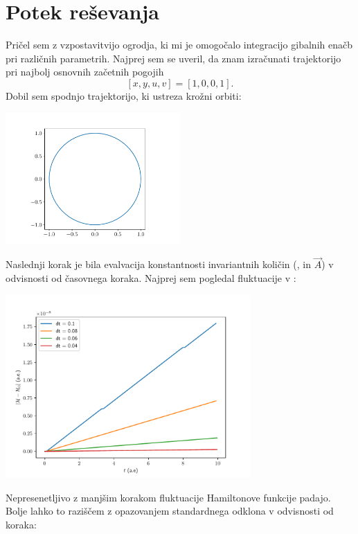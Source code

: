 \section{Potek reševanja}
Pričel sem z vzpostavitvijo ogrodja, ki mi je omogočalo integracijo gibalnih enačb pri različnih parametrih. Najprej sem se uveril, da znam izračunati trajektorijo pri najbolj osnovnih začetnih pogojih
\[\left[x,y,u,v \right] = \left[1,0,0,1 \right].\]
Dobil sem spodnjo trajektorijo, ki ustreza krožni orbiti:

\begin{center}
     \includegraphics[width=0.5\textwidth]{0-simple-trajectory.pdf}
\end{center}

Naslednji korak je bila evalvacija konstantnosti invariantnih količin (\HH, \LL{} in $\vec{{A}}$) v odvisnosti od časovnega koraka. Najprej sem pogledal fluktuacije v \HH{}:

\begin{center}
     \includegraphics[width=0.7\textwidth]{1-H.pdf}
\end{center}

Nepresenetljivo z manjšim korakom fluktuacije Hamiltonove funkcije padajo. Bolje lahko to raziščem z opazovanjem standardnega odklona \HH{} v odvisnosti od koraka:

